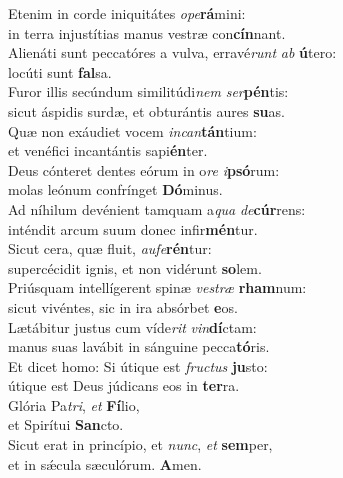 \evenverse Etenim in corde iniquitátes \textit{o}\textit{pe}\textbf{rá}mini:~\*\\
\evenverse in terra injustítias manus vestræ con\textbf{cín}nant.\\
\oddverse Alienáti sunt peccatóres a vulva, erravé\textit{runt} \textit{ab} \textbf{ú}tero:~\*\\
\oddverse locúti sunt \textbf{fal}sa.\\
\evenverse Furor illis secúndum similitúdi\textit{nem} \textit{ser}\textbf{pén}tis:~\*\\
\evenverse sicut áspidis surdæ, et obturántis aures \textbf{su}as.\\
\oddverse Quæ non exáudiet vocem \textit{in}\textit{can}\textbf{tán}tium:~\*\\
\oddverse et venéfici incantántis sapi\textbf{én}ter.\\
\evenverse Deus cónteret dentes eórum in o\textit{re} \textit{i}\textbf{psó}rum:~\*\\
\evenverse molas leónum confrínget \textbf{Dó}minus.\\
\oddverse Ad níhilum devénient tamquam a\textit{qua} \textit{de}\textbf{cúr}rens:~\*\\
\oddverse inténdit arcum suum donec infir\textbf{mén}tur.\\
\evenverse Sicut cera, quæ fluit, \textit{au}\textit{fe}\textbf{rén}tur:~\*\\
\evenverse supercécidit ignis, et non vidérunt \textbf{so}lem.\\
\oddverse Priúsquam intellígerent spinæ \textit{ve}\textit{stræ} \textbf{rham}num:~\*\\
\oddverse sicut vivéntes, sic in ira absórbet \textbf{e}os.\\
\evenverse Lætábitur justus cum víde\textit{rit} \textit{vin}\textbf{dí}ctam:~\*\\
\evenverse manus suas lavábit in sánguine pecca\textbf{tó}ris.\\
\oddverse Et dicet homo: Si útique est \textit{fru}\textit{ctus} \textbf{ju}sto:~\*\\
\oddverse útique est Deus júdicans eos in \textbf{ter}ra.\\
\evenverse Glória Pa\textit{tri}, \textit{et} \textbf{Fí}lio,~\*\\
\evenverse et Spirítui \textbf{San}cto.\\
\oddverse Sicut erat in princípio, et \textit{nunc}, \textit{et} \textbf{sem}per,~\*\\
\oddverse et in sǽcula sæculórum. \textbf{A}men.\\
